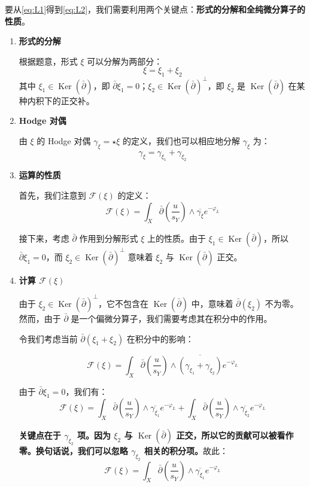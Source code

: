 \begin{solution}
    要从\eqref{eq:L1}得到\eqref{eq:L2}，我们需要利用两个关键点：\textbf{形式的分解和全纯微分算子的性质}。
\begin{enumerate}
\item  \textbf{形式的分解}

根据题意，形式 $\xi$ 可以分解为两部分：
$$
\xi = \xi_1 + \xi_2
$$
其中 $\xi_1 \in \operatorname{Ker}(\bar{\partial})$，即 $\bar{\partial} \xi_1 = 0$；$\xi_2 \in \operatorname{Ker}(\bar{\partial})^{\perp}$，即 $\xi_2$ 是 $\operatorname{Ker}(\bar{\partial})$ 在某种内积下的正交补。

\item  \textbf{Hodge 对偶}

由 $\xi$ 的 Hodge 对偶 $\gamma_{\xi} = \star \xi$ 的定义，我们也可以相应地分解 $\gamma_{\xi}$ 为：
$$
\gamma_{\xi} = \gamma_{\xi_1} + \gamma_{\xi_2}
$$

\item  \textbf{运算的性质}

首先，我们注意到 $\mathcal{F}(\xi)$ 的定义：
$$
\mathcal{F}(\xi) = \int_X \bar{\partial}\left(\frac{u}{s_Y}\right) \wedge \overline{\gamma_{\xi}} e^{-\varphi_L}
$$

接下来，考虑 $\bar{\partial}$ 作用到分解形式 $\xi$ 上的性质。由于 $\xi_1 \in \operatorname{Ker}(\bar{\partial})$，所以 $\bar{\partial} \xi_1 = 0$，而 $\xi_2 \in \operatorname{Ker}(\bar{\partial})^{\perp}$ 意味着 $\xi_2$ 与 $\operatorname{Ker}(\bar{\partial})$ 正交。

\item  \textbf{计算 $\mathcal{F}(\xi)$}

由于 $\xi_2 \in \operatorname{Ker}(\bar{\partial})^{\perp}$，它不包含在 $\operatorname{Ker}(\bar{\partial})$ 中，意味着 $\bar{\partial}(\xi_2)$ 不为零。然而，由于 $\bar{\partial}$ 是一个偏微分算子，我们需要考虑其在积分中的作用。

令我们考虑当前 $\bar{\partial}(\xi_1 + \xi_2)$ 在积分中的影响：

$$
\mathcal{F}(\xi) = \int_X \bar{\partial}\left(\frac{u}{s_Y}\right) \wedge \overline{(\gamma_{\xi_1} + \gamma_{\xi_2})} e^{-\varphi_L}
$$

由于 $\bar{\partial} \xi_1 = 0$，我们有：
$$
\mathcal{F}(\xi) = \int_X \bar{\partial}\left(\frac{u}{s_Y}\right) \wedge \overline{\gamma_{\xi_1}} e^{-\varphi_L} + \int_X \bar{\partial}\left(\frac{u}{s_Y}\right) \wedge \overline{\gamma_{\xi_2}} e^{-\varphi_L}
$$

\textbf{关键点在于 $\gamma_{\xi_2}$ 项。因为 $\xi_2$ 与 $\operatorname{Ker}(\bar{\partial})$ 正交，所以它的贡献可以被看作零。换句话说，我们可以忽略 $\gamma_{\xi_2}$ 相关的积分项。}故此：
$$
\mathcal{F}(\xi) = \int_X \bar{\partial}\left(\frac{u}{s_Y}\right) \wedge \overline{\gamma_{\xi_1}} e^{-\varphi_L}
$$


\end{enumerate}
\end{solution}

